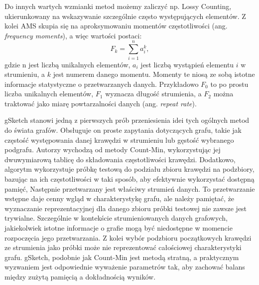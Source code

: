     Do innych wartych wzmianki metod możemy zaliczyć np. Lossy Counting\cite{Manku_Motwani_2012}, ukierunkowany na wskazywanie szczególnie często występujących elementów. Z kolei AMS\cite{Alon_Matias_Szegedy_1996} skupia się na aproksymowaniu momentów częstotliwości (ang. \textit{frequency moments}), a więc wartości postaci:
    \[
        F_k = \sum\limits_{i = 1}^{n} a_i^k,
    \]
    gdzie n jest liczbą unikalnych elementów, $a_i$ jest liczbą wystąpień elementu $i$ w strumieniu, a $k$ jest numerem danego momentu. Momenty te niosą ze sobą istotne informacje statystyczne o przetwarzanych danych. Przykładowo $F_0$ to po prostu liczba unikalnych elementów, $F_1$ wyznacza długość strumienia, a $F_2$ można traktować jako miarę powtarzalności danych (ang. \textit{repeat rate})\cite{Good_1982}. 
    
    gSketch\cite{Zhao_Aggarwal_Wang_2011} stanowi jedną z pierwszych prób przeniesienia idei tych ogólnych metod do świata grafów. Obsługuje on proste zapytania dotyczących grafu, takie jak częstość występowania danej krawędzi w strumieniu lub gęstość wybranego podgrafu. Autorzy wychodzą od metody Count-Min, wykorzystując jej dwuwymiarową tablicę do składowania częstotliwości krawędzi. Dodatkowo, algorytm wykorzystuje próbkę testową do podziału zbioru krawędzi na podzbiory, bazując na ich częstotliwości w taki sposób, aby efektywnie wykorzystać dostępną pamięć, Następnie przetwarzany jest właściwy strumień danych. To przetwarzanie wstępne daje cenny wgląd w charakterystykę grafu, ale należy pamiętać, że wyznaczanie reprezentacyjnej dla danego zbioru próbki testowej nie zawsze jest trywialne. Szczególnie w kontekście strumieniowanych danych grafowych, jakiekolwiek istotne informacje o grafie mogą być niedostępne w momencie rozpoczęcia jego przetwarzania. Z kolei wybór podzbioru początkowych krawędzi ze strumienia jako próbki może nie reprezentować całościowej charakterystyki grafu. gSketch, podobnie jak Count-Min jest metodą stratną, a praktycznym wyzwaniem jest odpowiednie wyważenie parametrów tak, aby zachować balans między zużytą pamięcią a dokładnością wyników.
    

